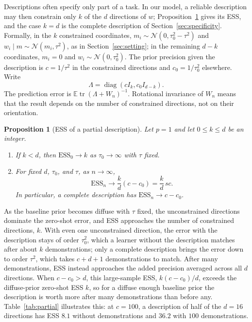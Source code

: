 \documentclass{article}
\newtheorem{proposition}[theorem]{Proposition}
\theoremstyle{definition}
\newcommand{\ess}{\mathrm{ESS}}
\newcommand{\E}{\mathbb{E}}
\begin{document}
Descriptions often specify only part of a task. In our model, a reliable description may then constrain only $k$ of the $d$ directions of $w$; Proposition~\ref{prop:partial} gives its ESS, and the case $k=d$ is the complete description of Section~\ref{sec:specificity}. Formally, in the $k$ constrained coordinates, $m_i\sim\mathcal N(0,\tau_0^2-\tau^2)$ and $w_i\mid m\sim\mathcal N(m_i,\tau^2)$, as in Section~\ref{sec:setting}; in the remaining $d-k$ coordinates, $m_i=0$ and $w_i\sim\mathcal N(0,\tau_0^2)$. The prior precision given the description is $c=1/\tau^2$ in the constrained directions and $c_0=1/\tau_0^2$ elsewhere. Write
\[
\Lambda=\operatorname{diag}(cI_k,c_0I_{d-k}).
\]
The prediction error is $\E\operatorname{tr}(\Lambda+W_n)^{-1}$. Rotational invariance of $W_n$ means that the result depends on the number of constrained directions, not on their orientation.

\begin{proposition}[ESS of a partial description]\label{prop:partial}
Let $p=1$ and let $0\le k\le d$ be an integer.
\begin{enumerate}[nosep]
    \item[(i)] If $k<d$, then $\ess_0\to k$ as $\tau_0\to\infty$ with $\tau$ fixed.
    \item[(ii)] For fixed $d$, $\tau_0$, and $\tau$, as $n\to\infty$,
    \[
    \ess_n\longrightarrow\frac{k}{d}(c-c_0)
    =\frac{k}{d}\,sc.
    \]
    In particular, a complete description has $\ess_n\to c-c_0$.
\end{enumerate}
\end{proposition}

As the baseline prior becomes diffuse with $\tau$ fixed, the unconstrained directions dominate the zero-shot error, and ESS approaches the number of constrained directions, $k$. With even one unconstrained direction, the error with the description stays of order $\tau_0^2$, which a learner without the description matches after about $k$ demonstrations; only a complete description brings the error down to order $\tau^2$, which takes $c+d+1$ demonstrations to match. After many demonstrations, ESS instead approaches the added precision averaged across all $d$ directions. When $c-c_0>d$, this large-sample ESS, $k(c-c_0)/d$, exceeds the diffuse-prior zero-shot ESS $k$, so for a diffuse enough baseline prior the description is worth more after many demonstrations than before any. Table~\ref{tab:partial} illustrates this: at $c=100$, a description of half of the $d=16$ directions has ESS $8.1$ without demonstrations and $36.2$ with $100$ demonstrations.
\end{document}
